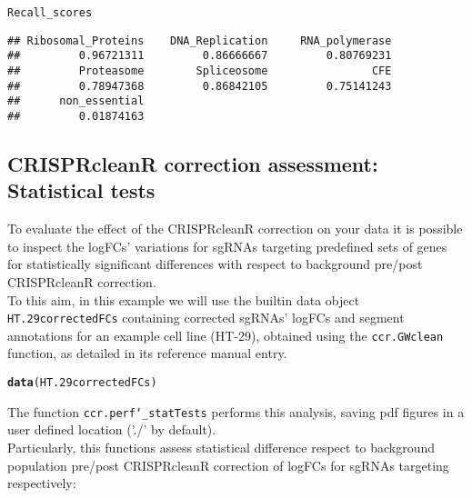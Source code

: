 \documentclass{article}\usepackage[]{graphicx}\usepackage[]{color}
\makeatletter
\newcommand{\hlstd}[1]{\textcolor[rgb]{0.345,0.345,0.345}{#1}}%
\newcommand{\hlkwd}[1]{\textcolor[rgb]{0.737,0.353,0.396}{\textbf{#1}}}%
\newenvironment{kframe}{%
 \def\at@end@of@kframe{}%
 \ifinner\ifhmode%
  \def\at@end@of@kframe{\end{minipage}}%
  \begin{minipage}{\columnwidth}%
 \fi\fi%
 \def\FrameCommand##1{\hskip\@totalleftmargin \hskip-\fboxsep
 \colorbox{shadecolor}{##1}\hskip-\fboxsep
     \hskip-\linewidth \hskip-\@totalleftmargin \hskip\columnwidth}%
 \MakeFramed {\advance\hsize-\width
   \@totalleftmargin\z@ \linewidth\hsize
   \@setminipage}}%
 {\par\unskip\endMakeFramed%
 \at@end@of@kframe}
\newenvironment{knitrout}{}{} %
\makeatother
\begin{document}
\begin{knitrout}
\color{fgcolor}\begin{kframe}
\begin{alltt}
\hlstd{Recall_scores}
\end{alltt}
\begin{verbatim}
## Ribosomal_Proteins    DNA_Replication     RNA_polymerase 
##         0.96721311         0.86666667         0.80769231 
##         Proteasome        Spliceosome                CFE 
##         0.78947368         0.86842105         0.75141243 
##      non_essential 
##         0.01874163
\end{verbatim}
\end{kframe}
\end{knitrout}

\subsection{CRISPRcleanR correction assessment: Statistical tests}
To evaluate the effect of the CRISPRcleanR correction on your data it is possible to inspect the logFCs' variations for sgRNAs targeting predefined sets of genes for statistically significant differences with respect to background pre/post CRISPRcleanR correction.\\

To this aim, in this example we will use the builtin data object\\ \texttt{HT.29correctedFCs} containing corrected sgRNAs' logFCs and segment annotations for an example cell line (HT-29), obtained using the \texttt{ccr.GWclean} function, as detailed in its reference manual entry.

\begin{knitrout}
\color{fgcolor}\begin{kframe}
\begin{alltt}
\hlkwd{data}\hlstd{(HT.29correctedFCs)}
\end{alltt}
\end{kframe}
\end{knitrout}

The function \texttt{ccr.perf\char`_statTests} performs this analysis, saving pdf figures in a user defined location ('./' by default).\\

Particularly, this functions assess statistical difference respect to background population pre/post CRISPRcleanR correction of logFCs for sgRNAs targeting respectively:
\end{document}
